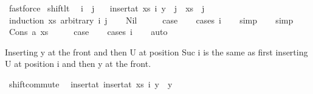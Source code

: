 \begin{isabellebody}
\ fastforce\isanewline
{}\isamarkupfalse%
%
\endisatagproof
{\isafoldproof}%
%
\isadelimproof
\isanewline
%
\endisadelimproof
\isanewline
\isanewline
\isanewline
{}\isamarkupfalse%
\ shift{\isacharunderscore}{\kern0pt}lt{\isacharcolon}{\kern0pt}\isanewline
\ \ {\isachardoublequoteopen}i\ {\isacharless}{\kern0pt}\ j\ {\isasymLongrightarrow}\isanewline
\ \ {\isacharparenleft}{\kern0pt}insert{\isacharunderscore}{\kern0pt}at\ xs\ i\ y{\isacharparenright}{\kern0pt}\ {\isacharbang}{\kern0pt}\ j\ {\isacharequal}{\kern0pt}\ xs\ {\isacharbang}{\kern0pt}\ {\isacharparenleft}{\kern0pt}j\ {\isacharminus}{\kern0pt}\ {}{\isacharparenright}{\kern0pt}{\isachardoublequoteclose}\isanewline
%
\isadelimproof
%
\endisadelimproof
%
\isatagproof
{}\isamarkupfalse%
\ {\isacharparenleft}{\kern0pt}induction\ xs\ arbitrary{\isacharcolon}{\kern0pt}\ i\ j{\isacharparenright}{\kern0pt}\isanewline
\ \ \isamarkupfalse%
\ Nil\isanewline
\ \ \isamarkupfalse%
\ \isamarkupfalse%
\ {\isacharquery}{\kern0pt}case\isanewline
\ \ \isamarkupfalse%
\ {\isacharparenleft}{\kern0pt}cases\ i{\isacharparenright}{\kern0pt}\isanewline
\ \ \isamarkupfalse%
\ simp\isanewline
\ \ \isamarkupfalse%
\ simp\isanewline
{}\isamarkupfalse%
\isanewline
\ \ \isamarkupfalse%
\ {\isacharparenleft}{\kern0pt}Cons\ a\ xs{\isacharparenright}{\kern0pt}\isanewline
\ \ \isamarkupfalse%
\ \isamarkupfalse%
\ {\isacharquery}{\kern0pt}case\isanewline
\ \ \isamarkupfalse%
\ {\isacharparenleft}{\kern0pt}cases\ i{\isacharparenright}{\kern0pt}\isanewline
\ \ \isamarkupfalse%
\ auto\isanewline
\ \ \isamarkupfalse%
\isanewline
{}\isamarkupfalse%
%
\endisatagproof
{\isafoldproof}%
%
\isadelimproof
%
\endisadelimproof
%
\begin{isamarkuptext}%
Inserting y at the front and then U at position Suc i is the same as
  first inserting U at position i and then y at the front.%
\end{isamarkuptext}\isamarkuptrue%
\isamarkupfalse%
\ shift{\isacharunderscore}{\kern0pt}commute{\isacharcolon}{\kern0pt}\isanewline
\ \ {\isachardoublequoteopen}insert{\isacharunderscore}{\kern0pt}at\ {\isacharparenleft}{\kern0pt}insert{\isacharunderscore}{\kern0pt}at\ xs\ i\ y{}{\isacharparenright}{\kern0pt}\ {}\ y{}\isanewline

\end{isabellebody}
